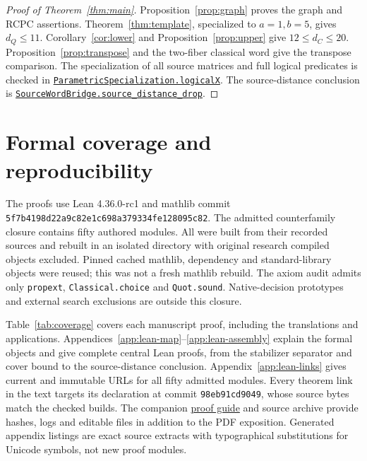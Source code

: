 \documentclass[11pt]{article}
\makeatletter
\theoremstyle{definition}\newtheorem{definition}[theorem]{Definition}
\newcommand{\proofcommit}{98eb91cd9049e6a88887a5ba79150ad96a4a3e53}
\newcommand{\proofbase}{https://github.com/alectionary/vibe-math/blob/\proofcommit/formalization/distance-preservation}
\newcommand{\lean}[2]{\href{\proofbase/#1.lean\#L\csname leanline@#2\endcsname}{\nolinkurl{#2}}}
\makeatother
\begin{document}
\begin{proof}[Proof of Theorem~\ref{thm:main}]
Proposition~\ref{prop:graph} proves the graph and RCPC assertions.
Theorem~\ref{thm:template}, specialized to $a=1,b=5$, gives
$d_Q\leq11$. Corollary~\ref{cor:lower} and
Proposition~\ref{prop:upper} give $12\leq d_C\leq20$.
Proposition~\ref{prop:transpose} and the two-fiber classical word
give the transpose comparison. The specialization of all source
matrices and full logical predicates is checked in
\lean{ParametricSpecialization}{ParametricSpecialization.logicalX}.
The source-distance conclusion is
\lean{SourceWordBridge}{SourceWordBridge.source_distance_drop}.
\end{proof}

\section{Formal coverage and reproducibility}\label{sec:formal}
The proofs use Lean 4.36.0-rc1 and mathlib commit
\texttt{5f7b4198d22a9c82e1c698a379334fe128095c82}.
The admitted counterfamily closure contains fifty authored modules.
All were built from their recorded sources and rebuilt in an isolated
directory with original research compiled objects excluded. Pinned
cached mathlib, dependency and standard-library objects were reused;
this was not a fresh mathlib rebuild. The axiom audit admits only
\texttt{propext}, \texttt{Classical.choice} and \texttt{Quot.sound}.
Native-decision prototypes and external search exclusions are outside
this closure.

Table~\ref{tab:coverage} covers each manuscript proof, including the
translations and applications. Appendices~\ref{app:lean-map}--\ref{app:lean-assembly}
explain the formal objects and give complete central Lean proofs, from
the stabilizer separator and cover bound to the source-distance conclusion.
Appendix~\ref{app:lean-links} gives current and immutable URLs for all fifty
admitted modules. Every theorem link in the text targets its declaration
at commit \texttt{98eb91cd9049}, whose source bytes match the checked
builds. The companion \href{PROOF-GUIDE.html}{proof guide} and source
archive provide hashes, logs and editable files in addition to the PDF
exposition. Generated appendix listings are exact source extracts with
typographical substitutions for Unicode symbols, not new proof modules.
\end{document}
